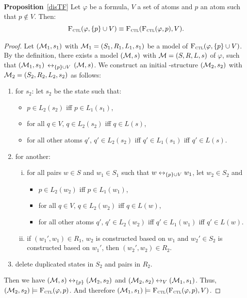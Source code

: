 \documentclass{article}
\begin{document}
\textbf{Proposition}~\ref{disTF} Let $\varphi$ be a formula, $V$ a set of atoms and $p$ an atom such that $p \notin V$. Then:
\[
{\textsc{F}_{\textsc{ctl}}}(\varphi, \{p\} \cup V) \equiv {\textsc{F}_{\textsc{ctl}}}({\textsc{F}_{\textsc{ctl}}}(\varphi, p), V).
\]
\begin{proof}
Let $({\cal M}_1, s_1) $ with ${\cal M}_1=(S_1, R_1, L_1,s_1)$ be a model of ${\textsc{F}_{\textsc{ctl}}}(\varphi, \{p\} \cup V)$. By the definition, there exists a model $({\cal M},s)$ with ${\cal M} = (S, R,L,s)$ of $\varphi$, such that $({\cal M}_1, s_1)$ $\leftrightarrow_{\{p\} \cup V}$ $({\cal M}, s)$. We construct an initial \MPK-structure $({\cal M}_2, s_2)$ with ${\cal M}_2 = (S_2, R_2, L_2,s_2)$ as follows:
\begin{enumerate}[(1)]
  \item for $s_2$: let $s_2$ be the state such that:
  \begin{itemize}
    \item $p \in L_2(s_2)$ iff $p \in L_1(s_1)$,
    \item for all $q \in V$, $q \in L_2(s_2)$ iff $q\in L(s)$,
    \item for all other atoms $q'$, $q' \in L_2(s_2)$ iff $q' \in L_1(s_1)$ iff $q'\in L(s)$.
  \end{itemize}
  \item for another:
  \begin{enumerate}[(i)]
    \item for all pairs  $w \in S$ and $w_1 \in S_1$ such that $w \leftrightarrow_{\{p\} \cup V} w_1$, let $w_2 \in S_2$ and
        \begin{itemize}
          \item $p \in L_2(w_2)$ iff $p \in L_1(w_1)$,
          \item for all $q \in V$, $q \in L_2(w_2)$ iff $q\in L(w)$,
          \item for all other atoms $q'$, $q' \in L_2(w_2)$ iff $q' \in L_1(w_1)$ iff $q'\in L(w)$.
        \end{itemize}
    \item if $(w_1', w_1)\in R_1$, $w_2$ is constructed based on $w_1$ and $w_2'\in S_2$ is constructed based on $w_1'$, then $(w_2', w_2)\in R_2$.
  \end{enumerate}
  \item delete duplicated states in $S_2$ and pairs in $R_2$.
\end{enumerate}
Then we have $({\cal M}, s) \leftrightarrow_{\{p\}} ({\cal M}_2, s_2)$ and $({\cal M}_2, s_2) \leftrightarrow_V ({\cal M}_1, s_1)$. Thus, $({\cal M}_2, s_2) \models {\textsc{F}_{\textsc{ctl}}}(\varphi, p)$. And therefore $({\cal M}_1, s_1) \models {\textsc{F}_{\textsc{ctl}}}({\textsc{F}_{\textsc{ctl}}}(\varphi, p), V)$.


\end{proof}
\end{document}
